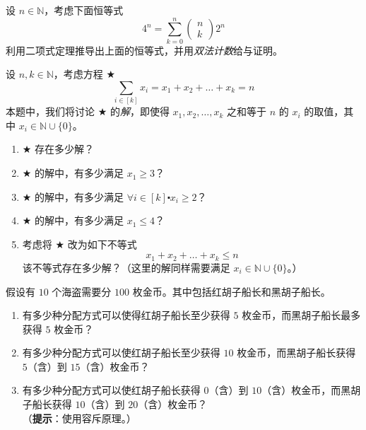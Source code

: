 \begin{exercise}
    设 $n \in \mathbb{N}$，考虑下面恒等式
    \[4^n = \sum_{k=0}^{n}\begin{pmatrix}n\\k\end{pmatrix}2^n\]
    利用二项式定理推导出上面的恒等式，并用\emph{双法计数}给与证明。
\end{exercise}

\begin{exercise}
    设 $n,k \in \mathbb{N}$，考虑方程 $\bigstar$
    \[\sum_{i \in [k]}x_i = x_1 + x_2 + \dots + x_k = n\]
    本题中，我们将讨论 $\bigstar$ 的\emph{解}，即使得 $ x_1 , x_2 , \dots , x_k$ 之和等于 $n$ 的 $x_i$ 的取值，其中 $x_i \in \mathbb{N} \cup \{0\}$。
    \begin{enumerate}[label=(\alph*)]
        \item $\bigstar$ 存在多少解？
        \item $\bigstar$ 的解中，有多少满足 $x_1 \ge 3$？
        \item $\bigstar$ 的解中，有多少满足 $\forall i \in [k] \centerdot x_i \ge 2$？
        \item $\bigstar$ 的解中，有多少满足 $x_1 \le 4$？
        \item 考虑将 $\bigstar$ 改为如下不等式
              \[x_1 + x_2 + \dots + x_k \le n\]
            该不等式存在多少解？（这里的解同样需要满足 $x_i \in \mathbb{N} \cup \{0\}$。）
    \end{enumerate}
\end{exercise}

\begin{exercise}
    假设有 $10$ 个海盗需要分 $100$ 枚金币。其中包括红胡子船长和黑胡子船长。
    \begin{enumerate}[label=(\alph*)]
        \item 有多少种分配方式可以使得红胡子船长至少获得 $5$ 枚金币，而黑胡子船长最多获得 $5$ 枚金币？
        \item 有多少种分配方式可以使红胡子船长至少获得 $10$ 枚金币，而黑胡子船长获得 $5$（含）到 $15$（含）枚金币？
        \item 有多少种分配方式可以使红胡子船长获得 $0$（含）到 $10$（含）枚金币，而黑胡子船长获得 $10$（含）到 $20$（含）枚金币？\\
        （\textbf{提示}：使用容斥原理。）
    \end{enumerate}
\end{exercise}
